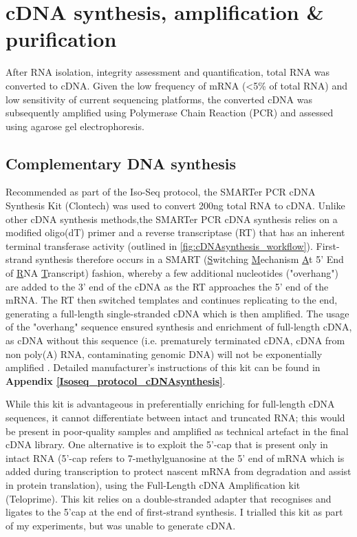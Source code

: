\newpage
\section{cDNA synthesis, amplification \& purification}
After RNA isolation, integrity assessment and quantification, total RNA was converted to cDNA. Given the low frequency of mRNA (<5\% of total RNA) and low sensitivity of current sequencing platforms, the converted cDNA was subsequently amplified using Polymerase Chain Reaction (PCR) and assessed using agarose gel electrophoresis. 


\subsection{Complementary DNA synthesis}
\label{section:ch2_cDNA_synthesis_explanation} 
Recommended as part of the Iso-Seq protocol, the SMARTer PCR cDNA Synthesis Kit (Clontech) was used to convert 200ng total RNA to cDNA. Unlike other cDNA synthesis methods,the SMARTer PCR cDNA synthesis relies on a modified oligo(dT) primer and a reverse transcriptase (RT) that has an inherent terminal transferase activity (outlined in \cref{fig:cDNAsynthesis_workflow}). First-strand synthesis therefore occurs in a SMART (\underline{S}witching \underline{M}echanism \underline{A}t 5' End of \underline{R}NA \underline{T}ranscript) fashion, whereby a few additional nucleotides ("overhang") are added to the 3' end of the cDNA as the RT approaches the 5' end of the mRNA. The RT then switched templates and continues replicating to the end, generating a full-length single-stranded cDNA which is then amplified. The usage of the "overhang" sequence ensured synthesis and enrichment of full-length cDNA, as cDNA without this sequence (i.e. prematurely terminated cDNA, cDNA from non poly(A) RNA, contaminating genomic DNA) will not be exponentially amplified \cite{Ramskold2012}. Detailed manufacturer's instructions of this kit can be found in \textbf{Appendix \ref{Isoseq_protocol_cDNAsynthesis}}. 

While this kit is advantageous in preferentially enriching for full-length cDNA sequences, it cannot differentiate between intact and truncated RNA; this would be present in poor-quality samples and amplified as technical artefact in the final cDNA library. One alternative is to exploit the 5’-cap that is present only in intact RNA (5'-cap refers to 7-methylguanosine at the 5’ end of mRNA which is added during transcription to protect nascent mRNA from degradation and assist in protein translation), using the Full-Length cDNA Amplification kit (Teloprime)\cite{Cartolano2016}. This kit relies on a double-stranded adapter that recognises and ligates to the 5’cap at the end of first-strand synthesis. I trialled this kit as part of my experiments, but was unable to generate cDNA. 

